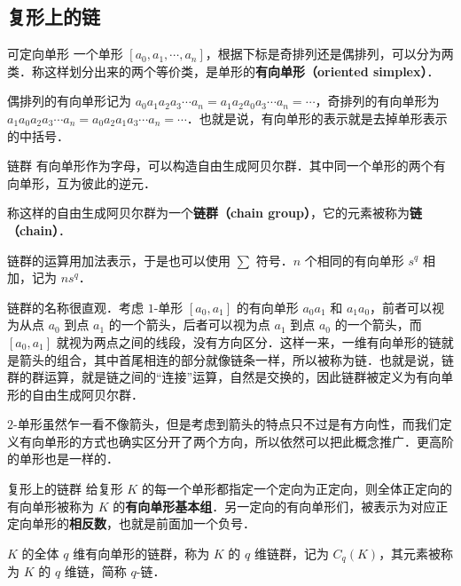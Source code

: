 



\subsection{复形上的链}

\begin{definition}{可定向单形}
一个单形 $[a_0, a_1, \cdots, a_n]$，根据下标是奇排列还是偶排列，可以分为两类．称这样划分出来的两个等价类，是单形的\textbf{有向单形（oriented simplex）}．

偶排列的有向单形记为 $a_0a_1a_2a_3\cdots a_n=a_1a_2a_0a_3\cdots a_n=\cdots$，奇排列的有向单形为 $a_1a_0a_2a_3\cdots a_n=a_0a_2a_1a_3\cdots a_n=\cdots$．也就是说，有向单形的表示就是去掉单形表示的中括号．
\end{definition}

\begin{definition}{链群}
有向单形作为字母，可以构造自由生成阿贝尔群．其中同一个单形的两个有向单形，互为彼此的逆元．

称这样的自由生成阿贝尔群为一个\textbf{链群（chain group）}，它的元素被称为\textbf{链（chain）}．

链群的运算用加法表示，于是也可以使用 $\sum$ 符号．$n$ 个相同的有向单形 $s^q$ 相加，记为 $ns^q$．
\end{definition}

链群的名称很直观．考虑 $1$-单形 $[a_0, a_1]$ 的有向单形 $a_0a_1$ 和 $a_1a_0$，前者可以视为从点 $a_0$ 到点 $a_1$ 的一个箭头，后者可以视为点 $a_1$ 到点 $a_0$ 的一个箭头，而 $[a_0, a_1]$ 就视为两点之间的线段，没有方向区分．这样一来，一维有向单形的链就是箭头的组合，其中首尾相连的部分就像链条一样，所以被称为链．也就是说，链群的群运算，就是链之间的“连接”运算，自然是交换的，因此链群被定义为有向单形的自由生成阿贝尔群．

$2$-单形虽然乍一看不像箭头，但是考虑到箭头的特点只不过是有方向性，而我们定义有向单形的方式也确实区分开了两个方向，所以依然可以把此概念推广．更高阶的单形也是一样的．

\begin{definition}{复形上的链群}
给复形 $K$ 的每一个单形都指定一个定向为正定向，则全体正定向的有向单形被称为 $K$ 的\textbf{有向单形基本组}．另一定向的有向单形们，被表示为对应正定向单形的\textbf{相反数}，也就是前面加一个负号．

$K$ 的全体 $q$ 维有向单形的链群，称为 $K$ 的 $q$ 维链群，记为 $C_q(K)$，其元素被称为 $K$ 的 $q$ 维链，简称 $q$-链．
\end{definition}

